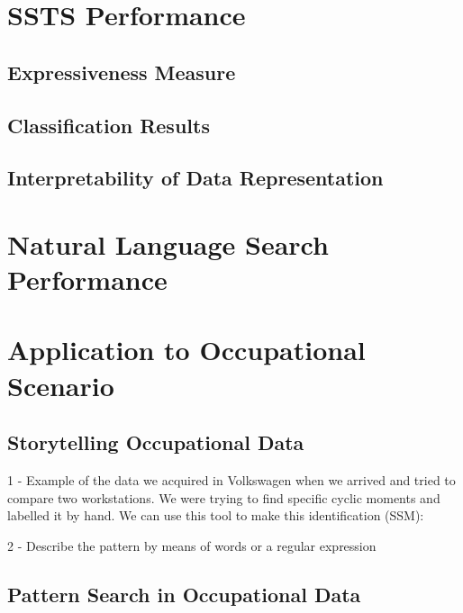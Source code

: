 \section{SSTS Performance}

\subsection{Expressiveness Measure}

\subsection{Classification Results}

\subsection{Interpretability of Data Representation}


\section{Natural Language Search Performance}



\section{Application to Occupational Scenario}
\label{cha:application_occ}


\subsection{Storytelling Occupational Data}
\label{subsec:storytel}

1 - Example of the data we acquired in Volkswagen when we arrived and tried to compare two workstations. We were trying to find specific cyclic moments and labelled it by hand. We can use this tool to make this identification (SSM):

2 - Describe the pattern by means of words or a regular expression


%

\subsection{Pattern Search in Occupational Data}
\label{subsec:search}


